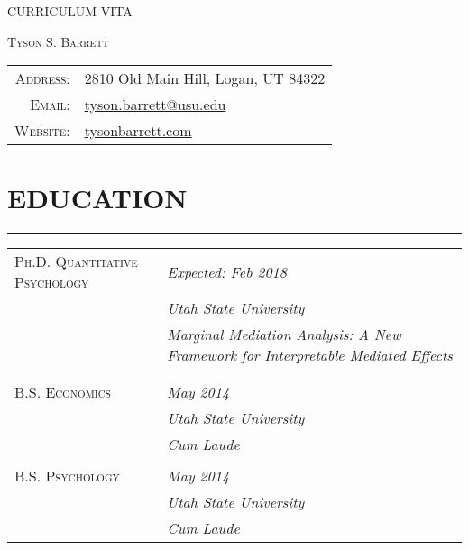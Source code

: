 \documentclass[]{DissertateUSU}
\begin{document}
\normalsize

\clearpage
{} 
\fancyhead[R]{\thepage} \fancyfoot[C]{}

\vspace*{\fill}

\begin{center}
    CURRICULUM VITA
  \end{center}

\vspace*{\fill}

\clearpage

\hspace{.08in}\huge\textsc{Tyson S. Barrett} \normalsize
\vspace{10pt}

\begin{tabular}{rl}
    \textsc{Address:}   & 2810 Old Main Hill, Logan, UT 84322 \\
    \textsc{Email:}     & \href{mailto:tyson.barrett@usu.edu}{tyson.barrett@usu.edu} \\
    \textsc{Website:}   & \href{tysonbarrett.com}{tysonbarrett.com}
\end{tabular}

\vspace{10pt} \tocless\section{EDUCATION} \vspace{-10pt} \hrule
\vspace{10pt}

\begin{tabular}{l|p{7cm}}
 \textsc{Ph.D. Quantitative Psychology} & \emph{Expected: Feb 2018}\\
 & \emph{Utah State University}\\
 &\footnotesize{\emph{Marginal Mediation Analysis: A New Framework for Interpretable Mediated Effects}}\\
 \multicolumn{2}{c}{} \\
 \multicolumn{2}{c}{} \\
 \textsc{B.S. Economics} & \emph{May 2014} \\
  & \emph{Utah State University}\\
 &\footnotesize{\emph{Cum Laude}}\\
 \multicolumn{2}{c}{} \\
\textsc{B.S. Psychology} & \emph{May 2014} \\
 & \emph{Utah State University}\\
&\footnotesize{\emph{Cum Laude}}
\end{tabular}
\end{document}

